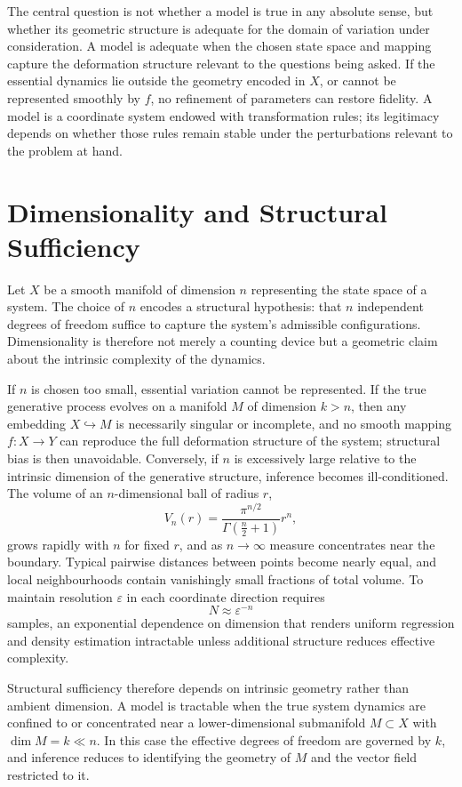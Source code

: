 \documentclass[12pt]{book}
\begin{document}
The central question is not whether a model is true in any absolute sense, but
whether its geometric structure is adequate for the domain of variation under
consideration. A model is adequate when the chosen state space and mapping
capture the deformation structure relevant to the questions being asked. If the
essential dynamics lie outside the geometry encoded in $X$, or cannot be
represented smoothly by $f$, no refinement of parameters can restore fidelity.
A model is a coordinate system endowed with transformation rules; its
legitimacy depends on whether those rules remain stable under the perturbations
relevant to the problem at hand.

\section{Dimensionality and Structural Sufficiency}

Let $X$ be a smooth manifold of dimension $n$ representing the state space of
a system. The choice of $n$ encodes a structural hypothesis: that $n$
independent degrees of freedom suffice to capture the system's admissible
configurations. Dimensionality is therefore not merely a counting device but a
geometric claim about the intrinsic complexity of the dynamics.

If $n$ is chosen too small, essential variation cannot be represented. If the
true generative process evolves on a manifold $M$ of dimension $k > n$, then
any embedding $X \hookrightarrow M$ is necessarily singular or incomplete, and
no smooth mapping $f : X \to Y$ can reproduce the full deformation structure
of the system; structural bias is then unavoidable. Conversely, if $n$ is
excessively large relative to the intrinsic dimension of the generative
structure, inference becomes ill-conditioned. The volume of an $n$-dimensional
ball of radius $r$,
\[
  V_n(r) = \frac{\pi^{n/2}}{\Gamma\!\left(\tfrac{n}{2}+1\right)} r^n,
\]
grows rapidly with $n$ for fixed $r$, and as $n \to \infty$ measure
concentrates near the boundary. Typical pairwise distances between points
become nearly equal, and local neighbourhoods contain vanishingly small
fractions of total volume. To maintain resolution $\varepsilon$ in each
coordinate direction requires
\[
  N \approx \varepsilon^{-n}
\]
samples, an exponential dependence on dimension that renders uniform regression
and density estimation intractable unless additional structure reduces effective
complexity.

Structural sufficiency therefore depends on intrinsic geometry rather than
ambient dimension. A model is tractable when the true system dynamics are
confined to or concentrated near a lower-dimensional submanifold $M \subset X$
with $\dim M = k \ll n$. In this case the effective degrees of freedom are
governed by $k$, and inference reduces to identifying the geometry of $M$ and
the vector field restricted to it.
\end{document}
